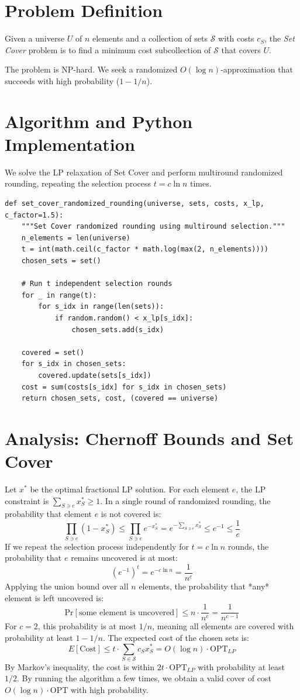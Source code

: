 \documentclass[11pt,oneside]{book}
\begin{document}
\section{Problem Definition}
Given a universe $U$ of $n$ elements and a collection of sets $\mathcal{S}$ with costs $c_S$, the \emph{Set Cover} problem is to find a minimum cost subcollection of $\mathcal{S}$ that covers $U$.

The problem is NP-hard. We seek a randomized $O(\log n)$-approximation that succeeds with high probability ($1 - 1/n$).

\section{Algorithm and Python Implementation}
We solve the LP relaxation of Set Cover and perform multiround randomized rounding, repeating the selection process $t = c \ln n$ times.

\begin{lstlisting}[style=python, caption=Randomized Rounding for Set Cover]
def set_cover_randomized_rounding(universe, sets, costs, x_lp, c_factor=1.5):
    """Set Cover randomized rounding using multiround selection."""
    n_elements = len(universe)
    t = int(math.ceil(c_factor * math.log(max(2, n_elements))))
    chosen_sets = set()
    
    # Run t independent selection rounds
    for _ in range(t):
        for s_idx in range(len(sets)):
            if random.random() < x_lp[s_idx]:
                chosen_sets.add(s_idx)
                
    covered = set()
    for s_idx in chosen_sets:
        covered.update(sets[s_idx])
    cost = sum(costs[s_idx] for s_idx in chosen_sets)
    return chosen_sets, cost, (covered == universe)
\end{lstlisting}

\section{Analysis: Chernoff Bounds and Set Cover}
Let $x^*$ be the optimal fractional LP solution. For each element $e$, the LP constraint is $\sum_{S \ni e} x_S^* \ge 1$.
In a single round of randomized rounding, the probability that element $e$ is not covered is:
\[
\prod_{S \ni e} (1 - x_S^*) \le \prod_{S \ni e} e^{-x_S^*} = e^{-\sum_{S \ni e} x_S^*} \le e^{-1} \le \frac{1}{e}
\]
If we repeat the selection process independently for $t = c \ln n$ rounds, the probability that $e$ remains uncovered is at most:
\[
(e^{-1})^t = e^{-c \ln n} = \frac{1}{n^c}
\]
Applying the union bound over all $n$ elements, the probability that *any* element is left uncovered is:
\[
\text{Pr}[\text{some element is uncovered}] \le n \cdot \frac{1}{n^c} = \frac{1}{n^{c-1}}
\]
For $c = 2$, this probability is at most $1/n$, meaning all elements are covered with probability at least $1 - 1/n$.
The expected cost of the chosen sets is:
\[
E[\text{Cost}] \le t \cdot \sum_{S \in \mathcal{S}} c_S x_S^* = O(\log n) \cdot \text{OPT}_{LP}
\]
By Markov's inequality, the cost is within $2 t \cdot \text{OPT}_{LP}$ with probability at least $1/2$. By running the algorithm a few times, we obtain a valid cover of cost $O(\log n) \cdot \text{OPT}$ with high probability.
\end{document}
